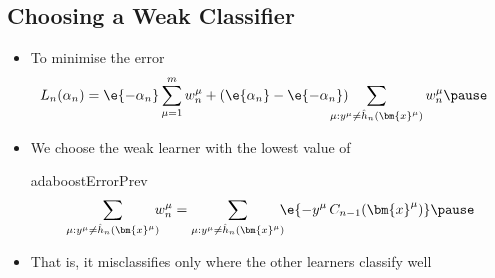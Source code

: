\begin{slide}
\section[-2]{Choosing a Weak Classifier}

\begin{PauseHighLight}
  \begin{itemize}
  \item To minimise the error
    \begin{align*}
       L_n(\alpha_n)  &= \e{-\alpha_n} \sum_{\mu=1}^m w_n^\mu +
        (\e{\alpha_n}-\e{-\alpha_n})\hspace{-1.5em} 
        \sum_{\mu:y^\mu\neq \hat{h}_n(\bm{x}^\mu)} w_n^\mu\pause
    \end{align*}
  \item We choose the weak learner with the lowest value of
    \begin{rightImage}{adaboostErrorPrev}
      \begin{align*}
        \sum_{\mu:y^\mu\neq \hat{h}_n(\bm{x}^\mu)}\!\!\! w_n^\mu
        =  \sum_{\mu:y^\mu\neq \hat{h}_n(\bm{x}^\mu)} \!\!\! \e{-y^\mu\,C_{n-1}(\bm{x}^\mu)}
        \pause
      \end{align*}  
    \end{rightImage}
  \item That is, it misclassifies only where the other learners classify
    well\pause 
  \end{itemize}
\end{PauseHighLight}

\end{slide}


